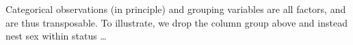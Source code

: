 \documentclass[
]{article}
\newenvironment{Shaded}{\begin{snugshade}}{\end{snugshade}}
\newcommand{\DataTypeTok}[1]{\textcolor[rgb]{0.13,0.29,0.53}{#1}}
\newcommand{\KeywordTok}[1]{\textcolor[rgb]{0.13,0.29,0.53}{\textbf{#1}}}
\newcommand{\NormalTok}[1]{#1}
\newcommand{\OperatorTok}[1]{\textcolor[rgb]{0.81,0.36,0.00}{\textbf{#1}}}
\newcommand{\StringTok}[1]{\textcolor[rgb]{0.31,0.60,0.02}{#1}}
\begin{document}
Categorical observations (in principle) and grouping variables are all
factors, and are thus transposable. To illustrate, we drop the column
group above and instead nest sex within status \ldots{}

\begin{Shaded}
\end{Shaded}
\end{document}
